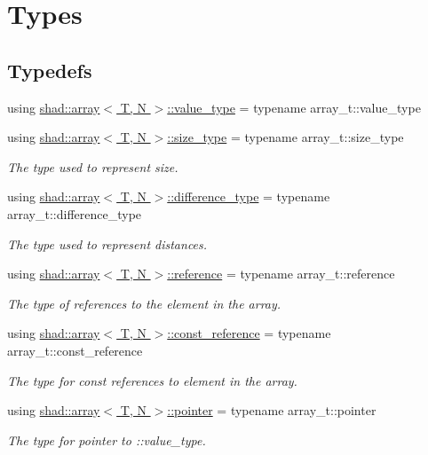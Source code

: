 \hypertarget{group__Types}{\section{Types}
\label{group__Types}
}
\subsection*{Typedefs}
\begin{DoxyCompactItemize}
\item 
using \hyperlink{group__Types_gaf417752888d4f1e19286503579310a52}{shad\-::array$<$ T, N $>$\-::value\-\_\-type} = typename array\-\_\-t\-::value\-\_\-type
\item 
using \hyperlink{group__Types_ga037c76c91958f47f53bfebad4d67f8bb}{shad\-::array$<$ T, N $>$\-::size\-\_\-type} = typename array\-\_\-t\-::size\-\_\-type
\begin{DoxyCompactList}\small\item\em The type used to represent size. \end{DoxyCompactList}\item 
using \hyperlink{group__Types_ga588f85dc2eccfd3b3a1a6229d4cfd04a}{shad\-::array$<$ T, N $>$\-::difference\-\_\-type} = typename array\-\_\-t\-::difference\-\_\-type
\begin{DoxyCompactList}\small\item\em The type used to represent distances. \end{DoxyCompactList}\item 
using \hyperlink{group__Types_gad3f7e8f8130d2cfb3b554c72f9f29c57}{shad\-::array$<$ T, N $>$\-::reference} = typename array\-\_\-t\-::reference
\begin{DoxyCompactList}\small\item\em The type of references to the element in the array. \end{DoxyCompactList}\item 
using \hyperlink{group__Types_gaac06273bdbb48ad582528e12e76bd859}{shad\-::array$<$ T, N $>$\-::const\-\_\-reference} = typename array\-\_\-t\-::const\-\_\-reference
\begin{DoxyCompactList}\small\item\em The type for const references to element in the array. \end{DoxyCompactList}\item 
using \hyperlink{group__Types_gadfa9e253e7692c86d9fa4386cebf9459}{shad\-::array$<$ T, N $>$\-::pointer} = typename array\-\_\-t\-::pointer
\begin{DoxyCompactList}\small\item\em The type for pointer to \-::value\-\_\-type. \end{DoxyCompactList}\item 

\end{DoxyCompactItemize}
